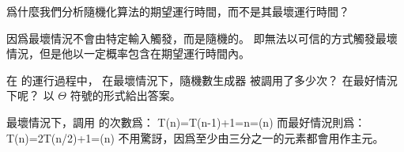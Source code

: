 \startsection[
  reference=section:rand_quicksort,
  title={A randomized version of quicksort},
]

\startEXERCISE
爲什麼我們分析隨機化算法的期望運行時間，而不是其最壞運行時間？
\stopEXERCISE

\startANSWER
因爲最壞情況不會由特定輸入觸發，而是隨機的。
即無法以可信的方式觸發最壞情況，但是他以一定概率包含在期望運行時間內。
\stopANSWER

\startEXERCISE
在  的運行過程中，
在最壞情況下，隨機數生成器  被調用了多少次？
在最好情況下呢？
以 $\Theta$ 符號的形式給出答案。
\stopEXERCISE

\startANSWER
最壞情況下，調用  的次數爲：
\startformula
T(n)=T(n-1)+1=n=\Theta(n)
\stopformula
而最好情況則爲：
\startformula
T(n)=2T(n/2)+1=\Theta(n)
\stopformula
不用驚訝，因爲至少由三分之一的元素都會用作主元。
\stopANSWER

\stopsection
